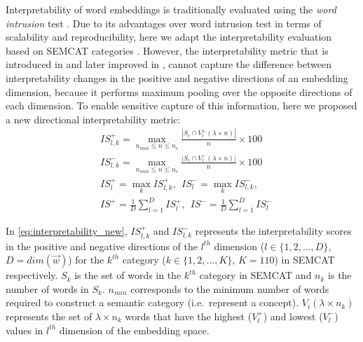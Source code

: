 \documentclass[11pt,a4paper]{article}
\begin{document}
Interpretability of word embeddings is traditionally evaluated using the \textit{word intrusion} test \citep{chang09wordintrusion}.
Due to its advantages over word intrusion test in terms of scalability and reproducibility, here we adapt the interpretability evaluation based on SEMCAT categories \citep{senel18semanticStructure}. However, the interpretability metric that is introduced in \citet{senel18semanticStructure} and later improved in \citet{senel18trInterpret}, cannot capture the difference between interpretability changes in the positive and negative directions of an embedding dimension, because it performs maximum pooling over the opposite directions of each dimension. To enable sensitive capture of this information, here we proposed a new directional interpretability metric:
\begin{equation} \label{eq:interpretability_new}
\begin{split}
&IS^+_{l,k} = \max_{n_{min} \leq n \leq n_c } \frac{|S_c \cap V^+_l(\lambda \times n)|}{n} \times 100  \\
&IS^-_{l,k} = \max_{n_{min} \leq n \leq n_c } \frac{|S_c \cap V^-_l(\lambda \times n)|}{n} \times 100  \\
&IS^+_{l} = \max_{k} IS^+_{l,k}, ~~ IS^-_{l} = \max_{k} IS^-_{l,k},\\
&IS^+ = \frac{1}{D}\sum\limits_{l=1}^D IS^+_{l}, ~~ IS^- = \frac{1}{D}\sum\limits_{l=1}^D IS^-_{l}
\end{split}
\end{equation}

In \eqref{eq:interpretability_new}, $IS^+_{l,k}$ and $IS^-_{l,k}$ represents the interpretability scores in the positive and negative directions of the $l^{th}$ dimension ($l \in \{1,2,...,D\}$, $D=dim(\vec{w})$) for the $k^{th}$ category ($k \in \{1,2,...,K\}$, $K=110$) in SEMCAT respectively. $S_k$ is the set of words in the $k^{th}$ category in SEMCAT and $n_k$ is the number of words in $S_k$. $n_{min}$ corresponds to the minimum number of words required to construct a semantic category (i.e.\ represent a concept). $V_i(\lambda \times n_k)$ represents the set of $\lambda \times n_k$ words that have the highest ($V_l^+$) and lowest ($V_l^-$) values in $l^{th}$ dimension of the embedding space. 
\end{document}
